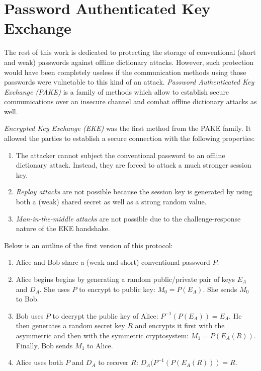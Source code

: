 \section{Password Authenticated Key Exchange}

The rest of this work is dedicated to protecting the storage of conventional (short and weak) passwords against offline dictionary attacks. However, such protection would have been completely useless if the communication methods using those passwords were vulnetable to this kind of an attack. \emph{Password Authenticated Key Exchange (PAKE)} is a family of methods which allow to establish secure communications over an insecure channel and combat offline dictionary attacks as well.

\emph{Encrypted Key Exchange (EKE)} was the first method from the PAKE family. It allowed the parties to establish a secure connection with the following properties:

\begin{enumerate}
    \item The attacker cannot subject the conventional password to an offline dictionary attack. Instead, they are forced to attack a much stronger session key.
    \item \emph{Replay attacks} are not possible because the session key is generated by using both a (weak) shared secret as well as a strong random value.
    \item \emph{Man-in-the-middle attacks} are not possible due to the challenge-response nature of the EKE handshake.
  \end{enumerate}

Below is an outline of the first version of this protocol:

\begin{enumerate}
    \item Alice and Bob share a (weak and short) conventional password \(P\).
    \item Alice begins begins by generating a random public/private pair of keys \(E_A\) and \(D_A\). She uses \(P\) to encrypt to public key: \(M_0 = P(E_A)\). She sends \(M_0\) to Bob.
    \item Bob uses \(P\) to decrypt the public key of Alice: \(P^{-1}(P(E_A)) = E_A\). He then generates a random secret key \(R\) and encrypts it first with the asymmetric and then with the symmetric cryptosystem: \(M_1 = P(E_A(R))\). Finally, Bob sends \(M_1\) to Alice.
    \item Alice uses both \(P\) and \(D_A\) to recover \(R\): \(D_A(P^{-1}(P(E_A(R))) = R\).
  \end{enumerate}

